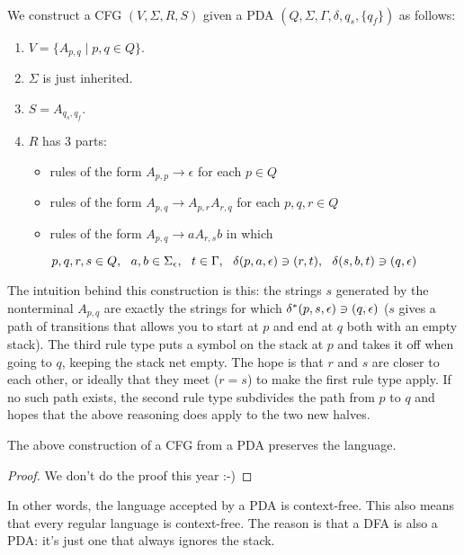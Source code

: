 \begin{code}~\\
We construct a CFG $(V,\Sigma,R,S)$ given a PDA $(Q,\Sigma,\Gamma,\delta,q_s,\{q_f\})$ as follows:
\begin{enumerate}
	\item $V = \{A_{p,q} \mid p, q \in Q\}$.
	\item $\Sigma$ is just inherited.
	\item $S = A_{q_s,q_f}$.
	\item $R$ has 3 parts:
	\begin{itemize}
		\item rules of the form $A_{p,p} \rightarrow \epsilon$ for each $p \in Q$
		\item rules of the form $A_{p,q} \rightarrow A_{p,r}A_{r,q}$ for each
		  $p, q, r \in Q$
		\item rules of the form $A_{p,q} \rightarrow aA_{r,s}b$ in which
		
		$p, q, r, s \in Q, ~~
		a,b \in \Sigma_\epsilon, ~~
		t \in \Gamma,~~
		\delta(p,a,\epsilon) \ni (r,t),~~
		\delta(s,b,t) \ni (q,\epsilon)$
	\end{itemize}
\end{enumerate}
\end{code}

The intuition behind this construction is this: the strings $s$ generated by the nonterminal $A_{p,q}$ are exactly the strings for which $\delta^*(p,s,\epsilon)\ni (q,\epsilon)$ ($s$ gives a path of transitions that allows you to start at $p$ and end at $q$ both with an empty stack). The third rule type puts a symbol on the stack at $p$ and takes it off when going to $q$, keeping the stack net empty. The hope is that $r$ and $s$ are closer to each other, or ideally that they meet ($r = s$) to make the first rule type apply. If no such path exists, the second rule type subdivides the path from $p$ to $q$ and hopes that the above reasoning does apply to the two new halves.

\begin{lemma} \label{equicfgpda2}
The above construction of a CFG from a PDA preserves the language.
\end{lemma}
\begin{proof}
We don't do the proof this year :-)  %
\end{proof}
In other words, the language accepted by a PDA is context-free. This also means that every regular language is context-free. The reason is that a DFA is also a PDA: it's just one that always ignores the stack.

